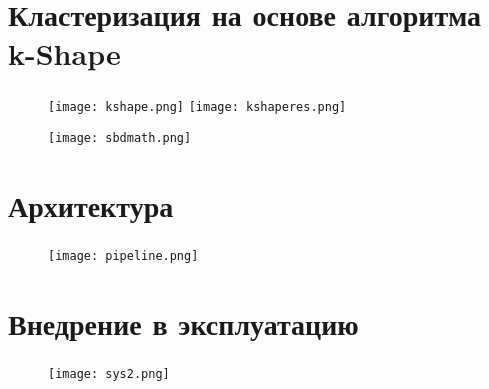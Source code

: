 
\section{Кластеризация на основе алгоритма k-Shape}

\begin{frame}
\frametitle{\insertsection}

\begin{figure}
    \center
    \texttt{[image: kshape.png]}
    \texttt{[image: kshaperes.png]}
\end{figure}

\begin{figure}
    \center
    \texttt{[image: sbdmath.png]}
\end{figure}


\end{frame}


\section{Архитектура}

\begin{frame}
\frametitle{\insertsection}

\begin{figure}
    \center
    \texttt{[image: pipeline.png]}
\end{figure}

\end{frame}


\section{Внедрение в эксплуатацию}

\begin{frame}
\frametitle{\insertsection}

\begin{figure}
    \center
    \texttt{[image: sys2.png]}
\end{figure}


\end{frame}

